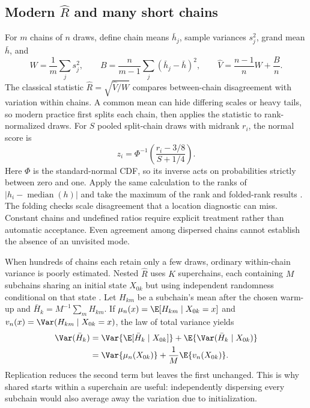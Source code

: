 \subsection{Modern \texorpdfstring{$\widehat R$}{R-hat} and many short chains}

For $m$ chains of $n$ draws, define chain means $\bar h_j$, sample
variances $s_j^2$, grand mean $\bar h$, and
\begin{equation}
 W=\frac1m\sum_j s_j^2,\qquad
 B=\frac{n}{m-1}\sum_j(\bar h_j-\bar h)^2,\qquad
 \widehat V=\frac{n-1}{n}W+\frac{B}{n}.
 \label{eq:bf-modern-rhat-components}
\end{equation}
The classical statistic $\widehat R=\sqrt{\widehat V/W}$ compares
between-chain disagreement with variation within chains. A common mean can
hide differing scales or heavy tails, so modern practice first splits each
chain, then applies the statistic to rank-normalized draws. For $S$ pooled
split-chain draws with midrank $r_i$, the normal score is
\begin{equation}
 z_i=\Phi^{-1}\!\left(\frac{r_i-3/8}{S+1/4}\right).
\label{eq:bf-modern-rank-transform}
\end{equation}
Here $\Phi$ is the standard-normal CDF, so its inverse acts on probabilities
strictly between zero and one. Apply the same calculation to the ranks of
$|h_i-\operatorname{median}(h)|$ and take the maximum of the rank and
folded-rank results \citep{vehtari2021rank}. The folding checks scale
disagreement that a location diagnostic can miss. Constant chains and
undefined ratios require explicit treatment rather than automatic acceptance.
Even agreement among dispersed chains cannot establish the absence of an
unvisited mode.

When hundreds of chains each retain only a few draws, ordinary within-chain
variance is poorly estimated. Nested $\widehat R$ uses $K$ superchains,
each containing $M$ subchains sharing an initial state $X_{0k}$ but using
independent randomness conditional on that state
\citep[Definition 2.2 and Theorem 3.1]{margossian2024nested}.
Let $H_{km}$ be a subchain's mean after the chosen warm-up and
$\bar H_k=M^{-1}\sum_m H_{km}$. If
$\mu_n(x)=\E[H_{km}\mid X_{0k}=x]$ and
$v_n(x)=\Var(H_{km}\mid X_{0k}=x)$, the law of total variance yields
\begin{align}
 \Var(\bar H_k)
 &=\Var\{\E[\bar H_k\mid X_{0k}]\}
       +\E\{\Var(\bar H_k\mid X_{0k})\}\\
 &=\Var\{\mu_n(X_{0k})\}
       +\frac1M\E\{v_n(X_{0k})\}.
 \label{eq:bf-modern-nested-decomposition}
\end{align}
Replication reduces the second term but leaves the first unchanged. This is
why shared starts within a superchain are useful: independently dispersing
every subchain would also average away the variation due to initialization.

